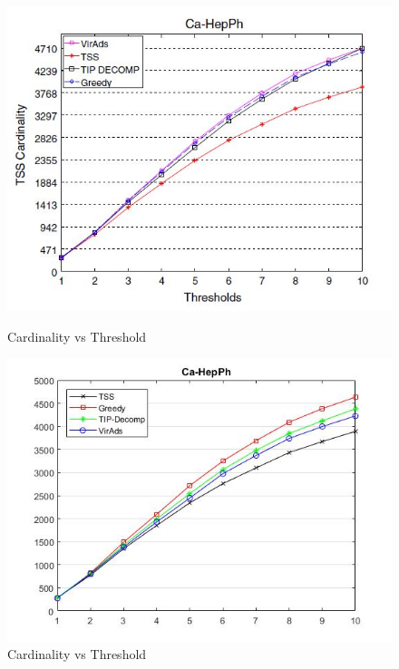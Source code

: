 \begin{figure}[h!]
\begin{minipage}[t]{0.50\textwidth}
\includegraphics[width=\linewidth,keepaspectratio=true]{images/ca-hepphpaper.jpg}
\caption{Cardinality vs Threshold}
\label{fase1}
\end{minipage}
\begin{minipage}[t]{0.50\textwidth}
\includegraphics[width=\linewidth,keepaspectratio=true]{images/ca-hepphresult.jpg}
\caption{Cardinality vs Threshold}
\end{minipage}
\end{figure}

